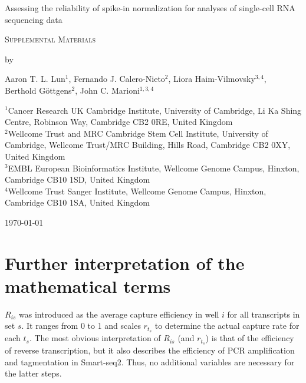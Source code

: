 \documentclass{article}
\begin{document}
\begin{titlepage}
\vspace*{3cm}
\begin{center}

{\LARGE
Assessing the reliability of spike-in normalization for analyses of single-cell RNA sequencing data
\par}

\vspace{0.75cm}

{\Large 
    \textsc{Supplemental Materials}
\par
}
\vspace{0.75cm}

\large
by


\vspace{0.75cm}
Aaron T. L. Lun$^1$, Fernando J. Calero-Nieto$^2$, Liora Haim-Vilmovsky$^{3,4}$, \\
Berthold G\"ottgens$^2$, John C. Marioni$^{1,3,4}$

\vspace{1cm}
\begin{minipage}{0.9\textwidth}
\begin{flushleft} 
$^1$Cancer Research UK Cambridge Institute, University of Cambridge, Li Ka Shing Centre, Robinson Way, Cambridge CB2 0RE, United Kingdom \\[6pt]
$^2$Wellcome Trust and MRC Cambridge Stem Cell Institute, University of Cambridge, Wellcome Trust/MRC Building, Hills Road, Cambridge CB2 0XY, United Kingdom \\[6pt]
$^3$EMBL European Bioinformatics Institute, Wellcome Genome Campus, Hinxton, Cambridge CB10 1SD, United Kingdom \\[6pt]
$^4$Wellcome Trust Sanger Institute, Wellcome Genome Campus, Hinxton, Cambridge CB10 1SA, United Kingdom \\[6pt]
\end{flushleft}
\end{minipage}

\vspace{1.5cm}
{\large \today{}}

\vspace*{\fill}
\end{center}
\end{titlepage}

\section{Further interpretation of the mathematical terms}
$R_{is}$ was introduced as the average capture efficiency in well $i$ for all transcripts in set $s$.
It ranges from 0 to 1 and scales $r_{t_s}$ to determine the actual capture rate for each $t_s$.
The most obvious interpretation of $R_{is}$ (and $r_{t_s}$) is that of the efficiency of reverse transcription, but it also describes the efficiency of PCR amplification and tagmentation in Smart-seq2.
Thus, no additional variables are necessary for the latter steps.
\end{document}
